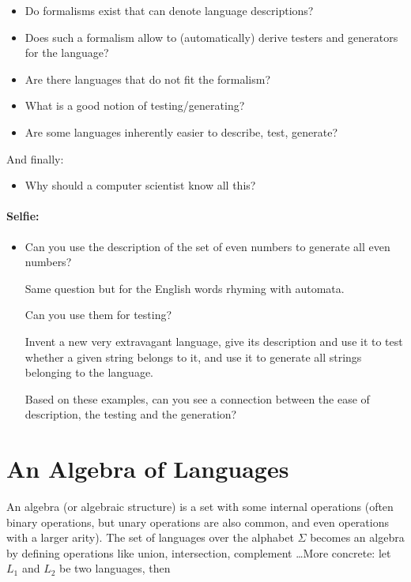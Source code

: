 \begin{itemize}
\item
Do formalisms exist that can denote language descriptions?

\item
Does such a formalism allow to (automatically) derive testers and
generators for the language?

\item
Are there languages that do not fit the formalism?

\item
What is a good notion of testing/generating?

\item
Are some languages inherently easier to describe, test, generate?

\end{itemize}

And finally:

\begin{itemize}
\item[] Why should a computer scientist know all this?
\end{itemize}


\paragraph{Selfie:}
\begin{itemize}
\item[]

Can you use the description of the set of even numbers to generate all even numbers?

Same question but for the English words rhyming with automata.

Can you use them for testing?

Invent a new very extravagant language, give its description and use
it to test whether a given string belongs to it, and use it to
generate all strings belonging to the language.

Based on these examples, can you see a connection between the ease of
description, the testing and the generation?
\end{itemize}

\section{An Algebra of Languages}

An algebra (or algebraic structure) is a set with some internal
operations (often binary operations, but unary operations are also
common, and even operations with a larger arity). The set of languages
over the alphabet $\Sigma$ becomes an algebra by defining operations
like union, intersection, complement \ldots More concrete:
let $L_1$ and $L_2$ be two languages, then

